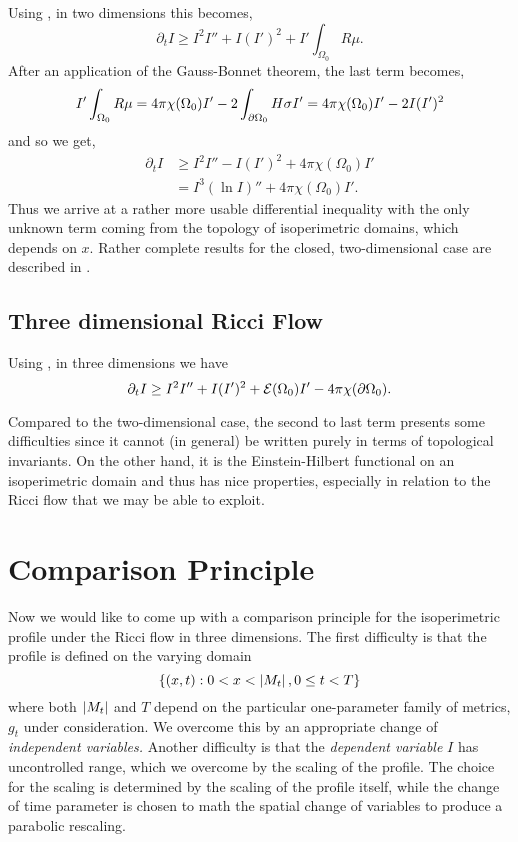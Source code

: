 \documentclass{amsart}
\begin{document}
Using , in two dimensions this becomes,
\[
\partial_t I \geq I^2I'' + I(I')^2 + I'\int_{\Omega_0} R \mu.
\]
After an application of the Gauss-Bonnet theorem, the last term becomes,
\[
I'\int_{\Omega_0} R \mu = 4\pi\chi(\Omega_0)I' - 2\int_{\partial {\Omega_0}} H \sigma I' = 4\pi\chi(\Omega_0)I'- 2 I (I')^2
\]
and so we get,
\begin{equation}
\label{eq:2d_viscosity_ricciflow}
\begin{split}
\partial_t I &\geq I^2I'' - I(I')^2 + 4\pi\chi(\Omega_0)I' \\
&= I^3 (\ln I)'' + 4\pi\chi(\Omega_0)I'.
\end{split}
\end{equation}
Thus we arrive at a rather more usable differential inequality with the only unknown term coming from the topology of isoperimetric domains, which depends on \(x\). Rather complete results for the closed, two-dimensional case are described in \cite{Bryan:/2016,AndrewsBryan:/2010}.

\subsection*{Three dimensional Ricci Flow}

Using , in three dimensions we have
\begin{equation}
\label{eq:3d_viscosity_ricciflow}
\partial_t I \geq I^2I'' + I(I')^2 + \operatorname{\mathcal{E}}({\Omega_0})I' - 4\pi\chi(\partial {\Omega_0}).
\end{equation}


Compared to the two-dimensional case, the second to last term presents some difficulties since it cannot (in general) be written purely in terms of topological invariants. On the other hand, it is the Einstein-Hilbert functional on an isoperimetric domain and thus has nice properties, especially in relation to the Ricci flow that we may be able to exploit.


\section{Comparison Principle}
\label{sec:comparison}

Now we would like to come up with a comparison principle for the isoperimetric profile under the Ricci flow in three dimensions. The first difficulty is that the profile is defined on the varying domain
\[
\{(x, t) : 0 < x < \left|{M_t}\right|, 0 \leq t < T\}
\]
where both \(\left|{M_t}\right|\) and \(T\) depend on the particular one-parameter family of metrics, \(g_t\) under consideration. We overcome this by an appropriate change of \emph{independent variables.} Another difficulty is that the \emph{dependent variable} \(I\) has uncontrolled range, which we overcome by the scaling of the profile. The choice for the scaling is determined by the scaling of the profile itself, while the change of time parameter is chosen to math the spatial change of variables to produce a parabolic rescaling.
\end{document}
